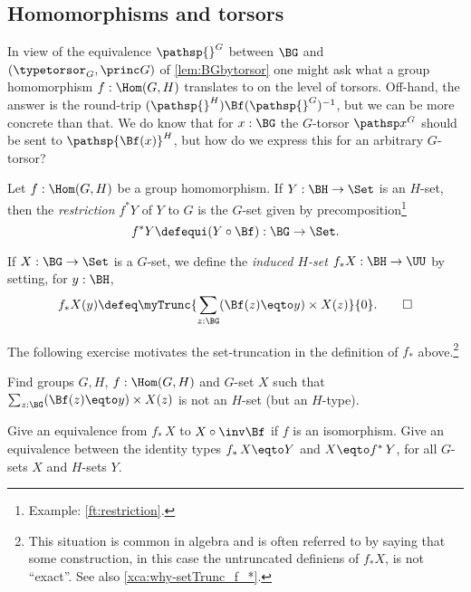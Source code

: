 \subsection{Homomorphisms and torsors}
\label{sec:homotor}
In view of the equivalence $\pathsp{}^G$ between $\BG$ and 
$(\typetorsor_G,\princ G)$ of \cref{lem:BGbytorsor} one might 
ask what a group homomorphism  $f:\Hom(G,H)$ translates to on 
the level of torsors.  Off-hand, the answer is the round-trip 
$(\pathsp{}^H)\Bf(\pathsp{}^G)^{-1}$, but we can be more concrete than that.
We do know that for $x:\BG$ the $G$-torsor $\pathsp x^G$ should be sent to
$\pathsp {\Bf(x)}^H$, but how do we express this for an arbitrary $G$-torsor?
\begin{definition}
  \label{def:restrictandinduce}
  Let $f:\Hom(G,H)$ be a group homomorphism.  If $Y:\BH\to\Set$ is an $H$-set,
  then the \emph{restriction}
  $f^*Y$ of $Y$ to $G$ is the $G$-set given by precomposition\footnote{%
  Example: \cref{ft:restriction}.}
  \[
    f^*Y\defequi (Y\circ\Bf) :\BG\to\Set.
  \]

  If $X:\BG\to\Set$ is a $G$-set, we define
  the \emph{induced $H$-set}
  $f_*X : \BH\to\UU$ by setting, for $y:\BH$,
  \[
    f_*X(y)\defeq\myTrunc{\sum_{z:\BG}(\Bf(z) \eqto y)\times X(z)}{0}.\qedhere
  \]
\end{definition}
The following exercise motivates the set-truncation in the definition
of $f_*$ above.\footnote{%
    This situation is common in algebra and is often referred to by saying
    that some construction, in this case the untruncated
    definiens of $f_*X$, is not ``exact''. See also \cref{xca:why-setTrunc_f_*}.}

\begin{xca}\label{xca:why-setTrunc_f_*}
Find groups $G,H$, $f:\Hom(G,H)$ and $G$-set $X$ such that
$\sum_{z:\BG}(\Bf(z) \eqto y)\times X(z)$ is not an $H$-set (but an $H$-type).
\end{xca}

\begin{xca}\label{xca:id_*-is-id}
 Give an equivalence from $f_*\,X$ to $X\circ\inv\Bf$
    if $f$ is an isomorphism. Give an equivalence between the identity
    types $f_*\,X \eqto Y$ and $X \eqto f^*\,Y$, for all $G$-sets $X$
    and $H$-sets $Y$.
\end{xca}


